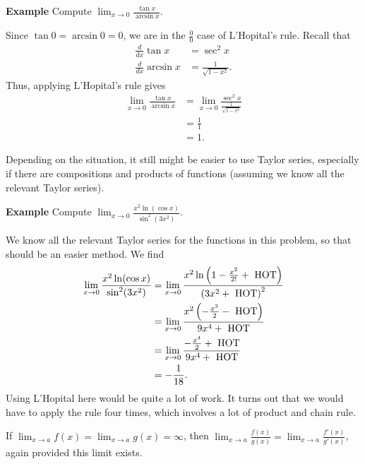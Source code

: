 \documentclass[a4paper]{book}
\begin{document}
\begin{sloppypar}
\textbf{Example} Compute $\displaystyle \lim_{x \rightarrow 0} \frac{\tan x}{\arcsin x}$.
\begin{examplebox}
Since $\tan 0 = \arcsin 0 = 0$, we are in the $\frac{0}{0}$ case of L'Hopital's rule. Recall that
\begin{align*}
\frac{d}{dx} \tan x &= \sec^2 x \\
\frac{d}{dx} \arcsin x &= \frac{1}{\sqrt{1-x^2}}.
\end{align*}
Thus, applying L'Hopital's rule gives
\begin{align*}
\lim_{x \rightarrow 0} \frac{\tan x}{\arcsin x} &= \lim_{x \rightarrow 0} \frac{ \sec^2 x }{ \frac{1}{\sqrt{1-x^2}} } \\
&= \frac{1}{1} \\
&= 1.
\end{align*}
\end{examplebox}
Depending on the situation, it still might be easier to use Taylor series, especially if there are compositions and products of functions (assuming we know all the relevant Taylor series).

\textbf{Example} Compute $\displaystyle \lim_{x \rightarrow 0} \frac{x^2 \ln( \cos x)}{\sin^2(3x^2)} $. 
\begin{examplebox}
We know all the relevant Taylor series for the functions in this problem, so that should be an easier method. We find
\begin{align*}
\lim_{x\rightarrow 0} \frac{x^2 \ln(\cos x)}{\sin^2(3x^2)} &= \lim_{x \rightarrow 0} \frac{x^2 \ln \left(1-\frac{x^2}{2!} + \hbox{ HOT}\right)}{\left(3x^2 + \hbox{ HOT}\right)^2} \\
&= \lim_{x \rightarrow 0} \frac{x^2 \left(-\frac{x^2}{2} - \hbox{ HOT}\right)}{9x^4 + \hbox{ HOT}} \\
&= \lim_{x \rightarrow 0} \frac{-\frac{x^4}{2} + \hbox{ HOT}}{9 x^4 + \hbox{ HOT}} \\
&= -\frac{1}{18}. 
\end{align*}
Using L'Hopital here would be quite a lot of work. It turns out that we would have to apply the rule four times, which involves a lot of product and chain rule.
\end{examplebox}

\begin{definitionbox}[title=\textbf{L'Hopital's Rule, $\frac{\infty}{\infty}$ case}]
If $\displaystyle \lim_{x\rightarrow a} f(x) = \lim_{x \rightarrow a} g(x) = \infty$, then $\displaystyle\lim_{x \rightarrow a} \frac{f(x)}{g(x)} = \lim_{x\rightarrow a} \frac{f'(x)}{g'(x)}$, again provided this limit exists.	
\end{definitionbox}


\end{sloppypar}
\end{document}
